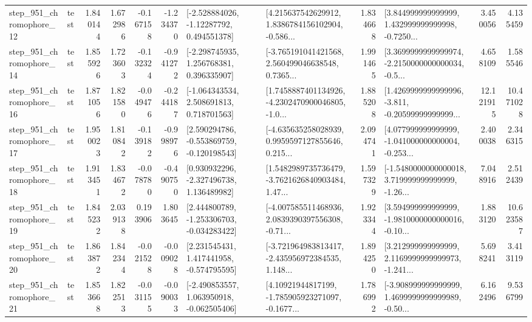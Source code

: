 \begin{tabular}{llrrrrllrlrr}
  step\_951\_chromophore\_12 &      test &      1.840144 &    1.672986 &     -0.167158 & -1.234370 &    [-2.528884026, -1.12287792, 0.494551378] &  [4.215637542629912, 1.8386784156102904, -0.586... &       1.834668 &  [3.844999999999999, 1.432999999999998, -0.7250... &            3.450056 &          4.135459 \\
  step\_951\_chromophore\_14 &      test &      1.855926 &    1.723603 &     -0.132324 & -0.941272 &    [-2.298745935, 1.256768381, 0.396335907] &  [-3.765191041421568, 2.560499046638548, 0.7365... &       1.991465 &  [3.3699999999999974, -2.2150000000000034, -0.5... &            4.658109 &          1.585546 \\
  step\_951\_chromophore\_16 &      test &      1.871056 &    1.821580 &     -0.049476 & -0.244187 &    [-1.064343534, 2.508691813, 0.718701563] &  [1.7458887401134926, -4.2302470900046805, -1.0... &       1.885208 &  [1.4269999999999996, -3.811, -0.20599999999999... &           12.121915 &         10.471028 \\
  step\_951\_chromophore\_17 &      test &      1.950023 &    1.810842 &     -0.139182 & -0.998976 &   [2.590294786, -0.553869759, -0.120198543] &  [-4.635635258028939, 0.9959597127855646, 0.215... &       2.094741 &  [4.077999999999999, -1.041000000000004, -0.253... &            2.400038 &          2.346315 \\
  step\_951\_chromophore\_18 &      test &      1.913451 &    1.834672 &     -0.078780 & -0.490750 &    [0.930932296, -2.327496738, 1.136489982] &  [1.5482989735736479, -3.7621626840903484, 1.47... &       1.597329 &  [-1.5480000000000018, 3.719999999999999, -1.26... &            7.048916 &          2.512439 \\
  step\_951\_chromophore\_19 &      test &      1.845232 &    2.039138 &      0.193906 &  1.803645 &   [2.444800789, -1.253306703, -0.034283422] &  [-4.007585511468936, 2.0839390397556308, -0.71... &       1.923344 &  [3.594999999999999, -1.9810000000000016, -0.10... &            1.883120 &         10.623587 \\
  step\_951\_chromophore\_20 &      test &      1.863872 &    1.842344 &     -0.021528 & -0.009028 &    [2.231545431, 1.417441958, -0.574795595] &  [-3.721964983813417, -2.435956972384535, 1.148... &       1.894250 &  [3.212999999999999, 2.1169999999999973, -1.241... &            5.698241 &          3.413119 \\
  step\_951\_chromophore\_21 &      test &      1.853668 &    1.822513 &     -0.031155 & -0.090033 &   [-2.490853557, 1.063950918, -0.062505406] &  [4.10921944817199, -1.785905923271097, -0.1677... &       1.786992 &  [-3.908999999999999, 1.4699999999999989, -0.50... &            6.162496 &          9.536799 \\

\end{tabular}
